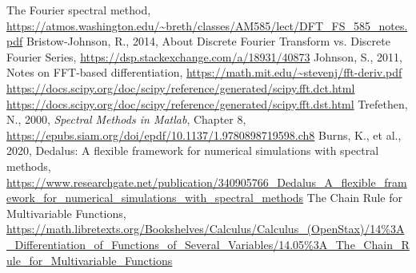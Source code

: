\documentclass[10pt]{article}
\begin{document}
\begin{thebibliography}{99}
	The Fourier spectral method, \url{https://atmos.washington.edu/~breth/classes/AM585/lect/DFT_FS_585_notes.pdf}
	Bristow-Johnson, R., 2014, About Discrete Fourier Transform vs. Discrete Fourier Series, \url{https://dsp.stackexchange.com/a/18931/40873}
	Johnson, S., 2011, Notes on FFT-based differentiation, \url{https://math.mit.edu/~stevenj/fft-deriv.pdf}
	\url{https://docs.scipy.org/doc/scipy/reference/generated/scipy.fft.dct.html}
	\url{https://docs.scipy.org/doc/scipy/reference/generated/scipy.fft.dst.html}
	Trefethen, N., 2000, \textit{Spectral Methods in Matlab}, Chapter 8, \url{https://epubs.siam.org/doi/epdf/10.1137/1.9780898719598.ch8}
	Burns, K., et al., 2020, Dedalus: A flexible framework for numerical simulations with spectral methods, \url{https://www.researchgate.net/publication/340905766_Dedalus_A_flexible_framework_for_numerical_simulations_with_spectral_methods}
	The Chain Rule for Multivariable Functions, \url{https://math.libretexts.org/Bookshelves/Calculus/Calculus_(OpenStax)/14%3A_Differentiation_of_Functions_of_Several_Variables/14.05%3A_The_Chain_Rule_for_Multivariable_Functions}
\end{thebibliography}
\end{document}
